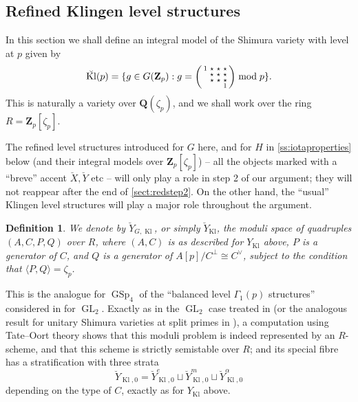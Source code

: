 \documentclass[cjm]{ipart}
\newenvironment{smatrix}{\left( \begin{smallmatrix} } {\end{smallmatrix} \right) }
\theoremstyle{plain}
\newtheorem{definition}[theorem]{Definition}
\theoremstyle{remark}
\DeclareMathOperator{\GL}{GL}
\DeclareMathOperator{\GSp}{GSp}
\DeclareMathOperator{\Kl}{Kl}
\newcommand{\QQ}{\mathbf{Q}}
\newcommand{\Zp}{\mathbf{Z}_p}
\numberwithin{equation}{subsection}
\begin{document}
 \subsection{Refined Klingen level structures}

  In this section we shall define an integral model of the Shimura variety with level at $p$ given by
  \[ \breve{\Kl}(p) = \{ g \in G(\Zp): g =
  \begin{smatrix} 1  & \star  & \star  & \star \\ & \star  & \star  & \star \\ & \star  & \star  & \star  \\ &&&1 \end{smatrix} \bmod p\}. \]
  This is naturally a variety over $\QQ(\zeta_p)$, and we shall work over the ring $R = \Zp[\zeta_p]$.

  \begin{remark}
   The refined level structures introduced for $G$ here, and for $H$ in \cref{ss:iotaproperties} below (and their integral models over $\Zp[\zeta_p]$) -- all the objects marked with a ``breve'' accent $\breve{X}, \breve{Y}$ etc -- will only play a role in step 2 of our argument; they will not reappear after the end of \cref{sect:redstep2}. On the other hand, the ``usual'' Klingen level structures will play a major role throughout the argument.
  \end{remark}

  \begin{definition}
   We denote by $\breve{Y}_{G, \Kl}$, or simply $\breve{Y}_{\Kl}$, the moduli space of quadruples $(A, C, P, Q)$ over $R$, where $(A, C)$ is as described for $Y_{\Kl}$ above, $P$ is a generator of $C$, and $Q$ is a generator of $A[p] / C^\perp \cong C^\vee$, subject to the condition that $\langle P, Q\rangle = \zeta_p$.
  \end{definition}

  This is the analogue for $\GSp_4$ of the ``balanced level $\Gamma_1(p)$ structures'' considered in \cite[\S 3.3]{katzmazur85} for $\GL_2$. Exactly as in the $\GL_2$ case treated in \cite[\S V.2]{delignerapoport73} (or the analogous result for unitary Shimura varieties at split primes in \cite[\S 3.3]{harristaylor02}), a computation using Tate--Oort theory shows that this moduli problem is indeed represented by an $R$-scheme, and that this scheme is strictly semistable over $R$; and its special fibre has a stratification with three strata
  \[ \breve{Y}_{\Kl,0} = \breve{Y}_{\Kl,0}^e \sqcup \breve{Y}_{\Kl,0}^m \sqcup \breve{Y}_{\Kl,0}^{\alpha}\]
  depending on the type of $C$, exactly as for $Y_{\Kl}$ above.
\end{document}
